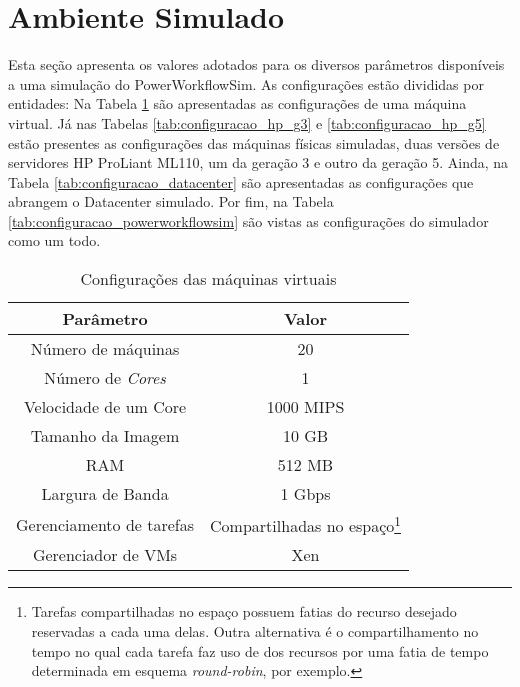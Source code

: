 \section{Ambiente Simulado}
\label{sec:ambiente_simulado}
Esta seção apresenta os valores adotados para os diversos parâmetros disponíveis
a uma simulação do PowerWorkflowSim. As configurações estão divididas
por entidades: Na Tabela \ref{tab:configuracao_vm} são apresentadas as
configurações de uma máquina virtual. Já nas Tabelas \ref{tab:configuracao_hp_g3}
e \ref{tab:configuracao_hp_g5} estão presentes as configurações das máquinas
físicas simuladas, duas versões de servidores HP ProLiant ML110, um da geração 3
e outro da geração 5. Ainda, na Tabela \ref{tab:configuracao_datacenter} são
apresentadas as configurações que abrangem o Datacenter simulado. Por fim,
na Tabela \ref{tab:configuracao_powerworkflowsim} são vistas as configurações
do simulador como um todo.

\begin{savenotes}
\begin{table}
	\centering
    \begin{tabular}{|c|c|}
    \hline
    \textbf{Parâmetro}     & \textbf{Valor}     \\ \hline
    Número de máquinas     & 20        \\
    Número de \emph{Cores} & 1         \\
    Velocidade de um Core  & 1000 MIPS \\
    Tamanho da Imagem      & 10 GB  \\
    RAM                    & 512 MB    \\
    Largura de Banda       & 1 Gbps \\
    Gerenciamento de tarefas & Compartilhadas no espaço\footnote{Tarefas
    compartilhadas no espaço possuem fatias do recurso desejado
    reservadas a cada uma delas. Outra alternativa é o compartilhamento no tempo
    no qual cada tarefa faz uso de dos recursos por uma fatia de tempo
    determinada em esquema \emph{round-robin}, por exemplo.} \\
    Gerenciador de VMs     & Xen       \\     \hline
    \end{tabular}
    \caption {Configurações das máquinas virtuais}
    \label{tab:configuracao_vm}
\end{table}
\end{savenotes}

